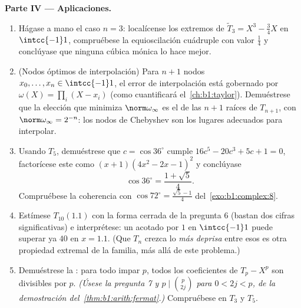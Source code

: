 \begin{problem}
\medskip
\noindent\textbf{Parte IV --- Aplicaciones.}
\begin{enumerate}[resume]
  \item Hágase a mano el caso $n = 3$: localícense los extremos de
        $\widetilde T_3 = X^3 - \frac34X$ en $\intcc{-1}1$,
        compruébese la equioscilación cuádruple con valor $\frac14$ y
        conclúyase que ninguna cúbica mónica lo hace mejor.
  \item (Nodos óptimos de interpolación) Para $n + 1$ nodos
        $x_0, \dots, x_n \in \intcc{-1}1$, el error de interpolación
        está gobernado por $\omega(X) = \prod_i (X - x_i)$ (como
        cuantificará el~\cref{ch:b1:taylor}). Demuéstrese que la
        elección que minimiza $\norm\omega_\infty$ es el  de
        las $n + 1$ raíces de $T_{n+1}$, con $\norm\omega_\infty =
        2^{-n}$: los nodos de Chebyshev son los lugares adecuados para
        interpolar.
  \item Usando $T_5$, demuéstrese que $c = \cos 36^\circ$ cumple
        $16c^5 - 20c^3 + 5c + 1 = 0$, factorícese este  como
        $(x + 1)(4x^2 - 2x - 1)^2$ y conclúyase
        \[
        \cos 36^\circ = \frac{1 + \sqrt5}4 .
        \]
        Compruébese la coherencia con $\cos 72^\circ =
        \frac{\sqrt5 - 1}4$ del~\cref{exo:b1:complex:8}.
  \item Estímese $T_{10}(1.1)$ con la forma cerrada de la pregunta 6
        (bastan dos cifras significativas) e interprétese: un
         acotado por $1$ en $\intcc{-1}1$ puede superar ya
        $40$ en $x = 1.1$. (Que $T_n$ crezca lo \emph{más deprisa}
        entre esos  es otra propiedad extremal de la
        familia, más allá de este problema.)
  \item Demuéstrese la : para todo  impar $p$,
        todos los coeficientes de $T_p - X^p$ son divisibles por $p$.
        \emph{(Úsese la pregunta 7 y $p \mid \binom p{2j}$ para
        $0 < 2j < p$, de la demostración
        del~\cref{thm:b1:arith:fermat}.)} Compruébese en $T_3$ y $T_5$.
\end{enumerate}


\end{problem}
